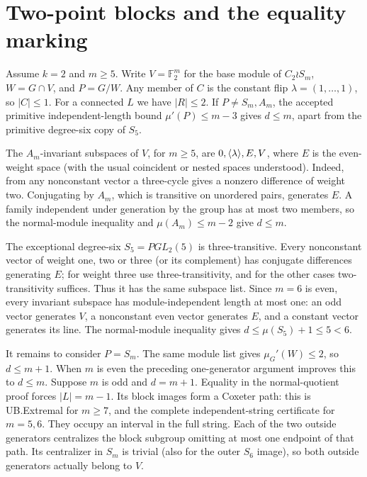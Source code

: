 \section{Two-point blocks and the equality marking}
Assume $k=2$ and $m\geq5$. Write $V=\mathbb F_2^m$ for the base
module of $C_2\wr S_m$, $W=G\cap V$, and $P=G/W$.
Any member of $C$ is the constant flip $\lambda=(1,\ldots,1)$,
so $|C|\leq1$. For a connected $L$ we have $|R|\leq2$.
If $P\ne S_m,A_m$, the accepted primitive independent-length bound
$\mu'(P)\leq m-3$ gives $d\leq m$, apart from the primitive degree-six
copy of $S_5$.

The $A_m$-invariant subspaces of $V$, for $m\geq5$, are
$0,\langle\lambda\rangle,E,V$, where $E$ is the even-weight space (with the
usual coincident or nested spaces understood). Indeed, from any
nonconstant vector a three-cycle gives a nonzero difference of weight
two. Conjugating by $A_m$, which is transitive on unordered pairs,
generates $E$. A family independent under generation by the group
has at most two members, so the normal-module inequality and
$\mu(A_m)\leq m-2$ give $d\leq m$.

The exceptional degree-six $S_5=PGL_2(5)$ is three-transitive.
Every nonconstant vector of weight one, two or three (or its complement)
has conjugate differences generating $E$; for weight three use
three-transitivity, and for the other cases two-transitivity suffices.
Thus it has the same subspace list. Since $m=6$ is even, every invariant
subspace has module-independent length at most one: an odd vector
generates $V$, a nonconstant even vector generates $E$, and a constant
vector generates its line. The normal-module inequality gives
$d\leq\mu(S_5)+1\leq5<6$.

It remains to consider $P=S_m$. The same module list gives
$\mu_G'(W)\leq2$, so $d\leq m+1$. When $m$ is even the preceding
one-generator argument improves this to $d\leq m$.
Suppose $m$ is odd and $d=m+1$. Equality in the normal-quotient proof
forces $|L|=m-1$. Its block images form a Coxeter path: this is
UB.Extremal for $m\geq7$, and the complete independent-string
certificate for $m=5,6$. They occupy an interval in the full string.
Each of the two outside generators centralizes the block subgroup
omitting at most one endpoint of that path. Its centralizer in $S_m$
is trivial (also for the outer $S_6$ image), so both outside generators
actually belong to $V$.

